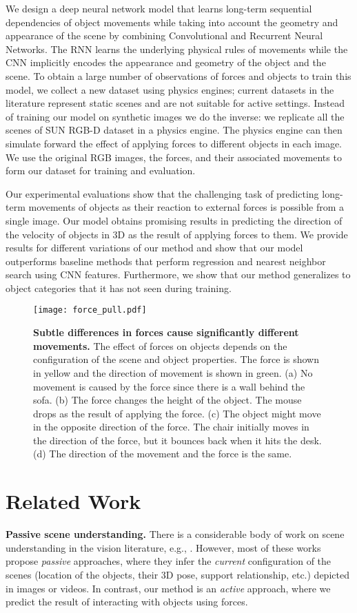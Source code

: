 \documentclass[runningheads]{llncs}
\begin{document}
We design a deep neural network model that learns long-term sequential dependencies of object movements while taking into account the geometry and appearance of the scene by combining Convolutional and Recurrent Neural Networks. The RNN learns the underlying physical rules of movements while the CNN implicitly encodes the appearance and geometry of the object and the scene.
To obtain a large number of observations of forces and objects to train this model, we collect a new dataset using physics engines; current datasets in the literature represent static scenes and are not suitable for active settings. Instead of training our model on synthetic images we do the inverse: we replicate all the scenes of SUN RGB-D dataset \cite{sunrgbd} in a physics engine. The physics engine can then simulate forward the effect of applying forces to different objects in each image. We use the original RGB images, the forces, and their associated movements to form our dataset for training and evaluation. 


Our experimental evaluations show that the challenging task of predicting long-term movements of objects as their reaction to external forces is possible from a single image.  Our model obtains promising results in predicting the direction of the velocity of objects in 3D as the result of applying forces to them. We provide results for different variations of our method and show that our model outperforms baseline methods that perform regression and nearest neighbor search using CNN features. Furthermore, we show that our method generalizes to object categories that it has not seen during training. 



\begin{figure*}[t]
\centering
  \texttt{[image: force\_pull.pdf]}
\caption{\textbf{Subtle differences in forces cause significantly different movements.} The effect of forces on objects depends on the configuration of the scene and object properties. The force is shown in yellow and the direction of movement is shown in green. (a) No movement is caused by the force since there is a wall behind the sofa. (b) The force changes the height of the object. The mouse drops as the result of applying the force. (c) The object might move in the opposite direction of the force. The chair initially moves in the direction of the force, but it bounces back when it hits the desk. (d) The direction of the movement and the force is the same.}
\label{fig:teaser}
\end{figure*} 
\section{Related Work}
\textbf{Passive scene understanding.} There is a considerable body of work on scene understanding in the vision literature, e.g., \cite{murphy03,gupta10,yao12,li09,heitz08,silberman12,choi13,lin13,zhang14}. However, most of these works propose \emph{passive} approaches, where they infer the \emph{current} configuration of the scenes (location of the objects, their 3D pose, support relationship, etc.) depicted in images or videos. In contrast, our method is an \emph{active} approach, where we predict the result of interacting with objects using forces. 
\end{document}
